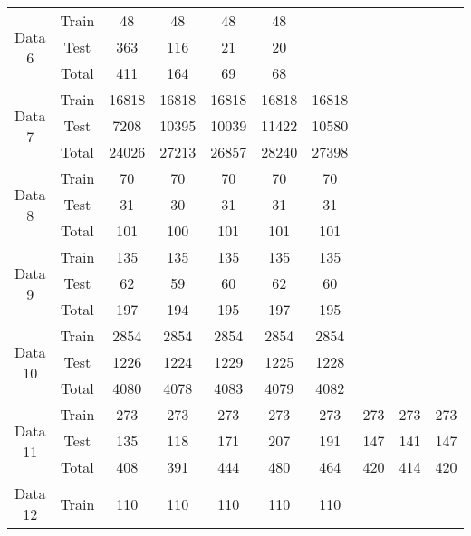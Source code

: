 \begin{table}[H]
{\begin{tabular}{cccccccccc}
\multirow{3}{*}{Data 6}  & Train & 48    & 48    & 48    & 48    &       &      &      &      \\
                         & Test  & 363   & 116   & 21    & 20    &       &      &      &      \\
                         & Total & 411   & 164   & 69    & 68    &       &      &      &      \\ \hline
\multirow{3}{*}{Data 7}  & Train & 16818 & 16818 & 16818 & 16818 & 16818 &      &      &      \\
                         & Test  & 7208  & 10395 & 10039 & 11422 & 10580 &      &      &      \\
                         & Total & 24026 & 27213 & 26857 & 28240 & 27398 &      &      &      \\ \hline
\multirow{3}{*}{Data 8}  & Train & 70    & 70    & 70    & 70    & 70    &      &      &      \\
                         & Test  & 31    & 30    & 31    & 31    & 31    &      &      &      \\
                         & Total & 101   & 100   & 101   & 101   & 101   &      &      &      \\ \hline
\multirow{3}{*}{Data 9}  & Train & 135   & 135   & 135   & 135   & 135   &      &      &      \\
                         & Test  & 62    & 59    & 60    & 62    & 60    &      &      &      \\
                         & Total & 197   & 194   & 195   & 197   & 195   &      &      &      \\ \hline
\multirow{3}{*}{Data 10} & Train & 2854  & 2854  & 2854  & 2854  & 2854  &      &      &      \\
                         & Test  & 1226  & 1224  & 1229  & 1225  & 1228  &      &      &      \\
                         & Total & 4080  & 4078  & 4083  & 4079  & 4082  &      &      &      \\ \hline
\multirow{3}{*}{Data 11} & Train & 273   & 273   & 273   & 273   & 273   &  273 &  273 &  273 \\
                         & Test  & 135   & 118   & 171   & 207   & 191   &  147 &  141 &  147 \\
                         & Total & 408   & 391   & 444   & 480   & 464   &  420 &  414 &  420 \\ \hline
\multirow{3}{*}{Data 12} & Train & 110   & 110   & 110   & 110   & 110   &      &      &      \\

\end{tabular}}
\end{table}
